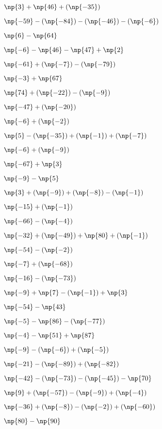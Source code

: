 {{\item$\np{3} + \np{46} + (\np{-35})$  \item$\np{-59} - (\np{-84}) - (\np{-46}) - (\np{-6})$  \item$\np{6} - \np{64}$

\item$\np{-6} - \np{46} - \np{47} + \np{2}$  \item$\np{-61} + (\np{-7}) - (\np{-79})$  \item$\np{-3} + \np{67}$

\item$\np{74} + (\np{-22}) - (\np{-9})$  \item$\np{-47} + (\np{-20})$  \item$\np{-6} + (\np{-2})$

\item$\np{5} - (\np{-35}) + (\np{-1}) + (\np{-7})$  \item$\np{-6} + (\np{-9})$  \item$\np{-67} + \np{3}$

\item$\np{-9} - \np{5}$  \item$\np{3} + (\np{-9}) + (\np{-8}) - (\np{-1})$  \item$\np{-15} + (\np{-1})$

\item$\np{-66} - (\np{-4})$  \item$\np{-32} + (\np{-49}) + \np{80} + (\np{-1})$  \item$\np{-54} - (\np{-2})$

\item$\np{-7} + (\np{-68})$  \item$\np{-16} - (\np{-73})$  \item$\np{-9} + \np{7} - (\np{-1}) + \np{3}$

\item$\np{-54} - \np{43}$  \item$\np{-5} - \np{86} - (\np{-77})$  \item$\np{-4} - \np{51} + \np{87}$

\item$\np{-9} - (\np{-6}) + (\np{-5})$  \item$\np{-21} - (\np{-89}) + (\np{-82})$  \item$\np{-42} - (\np{-73}) - (\np{-45}) - \np{70}$

\item$\np{9} + (\np{-57}) - (\np{-9}) + (\np{-4})$  \item$\np{-36} + (\np{-8}) - (\np{-2}) + (\np{-60})$  \item$\np{80} - \np{90}$

}}
